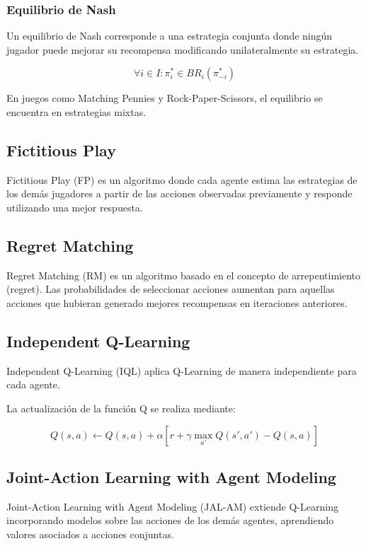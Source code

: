 \documentclass[letterpaper,12pt]{article} %
\begin{document}
\subsubsection{Equilibrio de Nash}

Un equilibrio de Nash corresponde a una estrategia conjunta donde ningún jugador puede mejorar su recompensa modificando unilateralmente su estrategia.

\[
\forall i \in I : \pi_i^* \in BR_i(\pi_{-i}^*)
\]

En juegos como Matching Pennies y Rock-Paper-Scissors, el equilibrio se encuentra en estrategias mixtas.

\subsection{Fictitious Play}

Fictitious Play (FP) es un algoritmo donde cada agente estima las estrategias de los demás jugadores a partir de las acciones observadas previamente y responde utilizando una mejor respuesta.

\subsection{Regret Matching}

Regret Matching (RM) es un algoritmo basado en el concepto de arrepentimiento (regret). Las probabilidades de seleccionar acciones aumentan para aquellas acciones que hubieran generado mejores recompensas en iteraciones anteriores.

\subsection{Independent Q-Learning}

Independent Q-Learning (IQL) aplica Q-Learning de manera independiente para cada agente.

La actualización de la función Q se realiza mediante:

\[
Q(s,a) \leftarrow Q(s,a) +
\alpha
\left[
r + \gamma \max_{a'} Q(s',a') - Q(s,a)
\right]
\]

\subsection{Joint-Action Learning with Agent Modeling}

Joint-Action Learning with Agent Modeling (JAL-AM) extiende Q-Learning incorporando modelos sobre las acciones de los demás agentes, aprendiendo valores asociados a acciones conjuntas.
\end{document}
